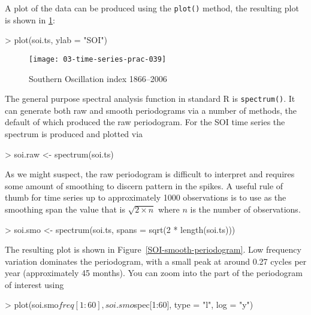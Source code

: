 \documentclass[a4paper,10pt]{article}
\begin{document}
A plot of the data can be produced using the \texttt{plot()} method, the resulting plot is shown in \ref{SOI-plot}:

\begin{Schunk}
\begin{Sinput}
> plot(soi.ts, ylab = "SOI")
\end{Sinput}
\end{Schunk}

\begin{figure}[t]
\begin{center}
\texttt{[image: 03-time-series-prac-039]}
\caption{\label{SOI-plot}Southern Oscillation index 1866--2006}
\end{center}
\end{figure}

The general purpose spectral analysis function in standard R is \texttt{spectrum()}. It can generate both raw and smooth periodograms via a number of methods, the default of which produced the raw periodogram. For the SOI time series the spectrum is produced and plotted via

\begin{Schunk}
\begin{Sinput}
> soi.raw <- spectrum(soi.ts)
\end{Sinput}
\end{Schunk}

As we might suspect, the raw periodogram is difficult to interpret and requires some amount of smoothing to discern pattern in the spikes. A useful rule of thumb for time series up to approximately 1000 observations is to use as the smoothing span the value that is $\sqrt{2 \times n}$ where $n$ is the number of observations.

\begin{Schunk}
\begin{Sinput}
> soi.smo <- spectrum(soi.ts, spans = sqrt(2 * length(soi.ts)))
\end{Sinput}
\end{Schunk}

The resulting plot is shown in Figure~\ref{SOI-smooth-periodogram}. Low frequency variation dominates the periodogram, with a small peak at around 0.27 cycles per year (approximately 45 months). You can zoom into the part of the periodogram of interest using
\begin{Schunk}
\begin{Sinput}
> plot(soi.smo$freq[1:60], soi.smo$spec[1:60], type = "l", log = "y")
\end{Sinput}
\end{Schunk}
\end{document}
